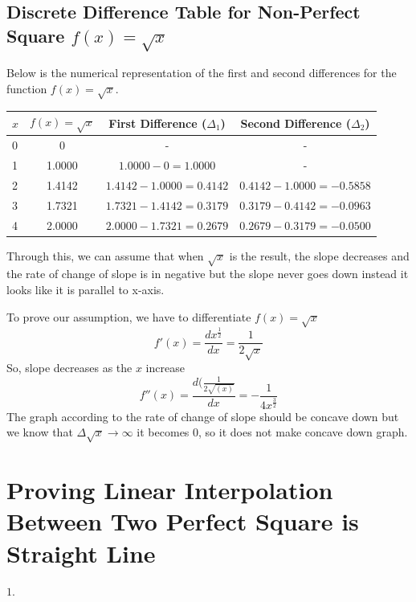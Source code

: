 \documentclass{article}
\begin{document}
\subsection*{Discrete Difference Table for Non-Perfect Square $f(x) = \sqrt{x}$}
Below is the numerical representation of the first and second differences for the function $f(x) = \sqrt{x}$.

\begin{table}[h]
\centering
\begin{tabular}{|l|c|c|c|}
\hline
$x$ & $f(x) = \sqrt{x}$ & \textbf{First Difference} ($\Delta_1$) & \textbf{Second Difference} ($\Delta_2$) \\ \hline
0 & 0 & - & - \\ \hline
1 & 1.0000 & $1.0000 - 0 = 1.0000$ & - \\ \hline
2 & 1.4142 & $1.4142 - 1.0000 = 0.4142$ & $0.4142 - 1.0000 = -0.5858$ \\ \hline
3 & 1.7321 & $1.7321 - 1.4142 = 0.3179$ & $0.3179 - 0.4142 = -0.0963$ \\ \hline
4 & 2.0000 & $2.0000 - 1.7321 = 0.2679$ & $0.2679 - 0.3179 = -0.0500$ \\ \hline
\end{tabular}
\end{table}
Through this, we can assume that when $\sqrt{x}$ is the result, the slope decreases and the rate of change of slope is in negative but the slope never goes down instead it looks like it is parallel to x-axis. 

To prove our assumption, we have to differentiate $f(x) = \sqrt{x}$
\begin{equation}
    f'(x) = \frac{dx^\frac{1}{2}}{dx} = \frac{1}{2\sqrt{x}}
\end{equation}
So, slope decreases as the $x$ increase
\begin{equation}
    f''(x) = \frac{d(\frac{1}{2\sqrt{(x)}}}{dx} = - \frac{1}{4{x^\frac{3}{2}}}
\end{equation}
The graph according to the rate of change of slope should be concave down but we know that $\Delta \sqrt{x} \to \infty$ it becomes $0$, so it does not make concave down graph. 
\newpage
\section{Proving Linear Interpolation Between Two Perfect Square is Straight Line}
$1. $
\end{document}
